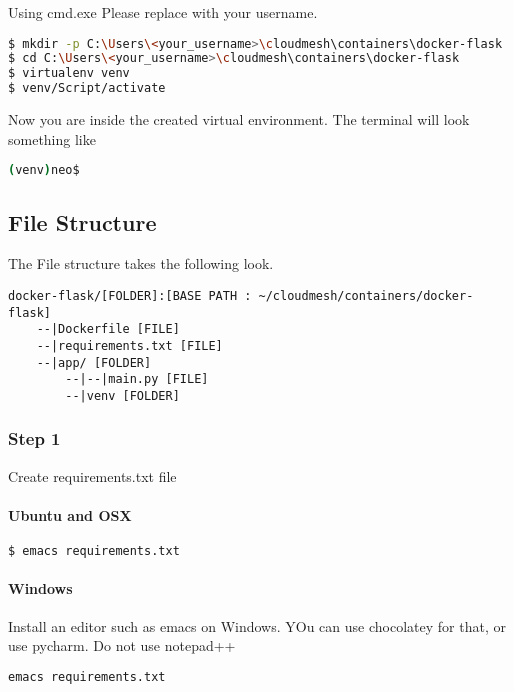 Using cmd.exe Please replace with your username.

\begin{lstlisting}[language=bash]
$ mkdir -p C:\Users\<your_username>\cloudmesh\containers\docker-flask
$ cd C:\Users\<your_username>\cloudmesh\containers\docker-flask
$ virtualenv venv
$ venv/Script/activate
\end{lstlisting}

Now you are inside the created virtual environment. The terminal will
look something like

\begin{lstlisting}[language=bash]
(venv)neo$
\end{lstlisting}

\subsection{File Structure}

The File structure takes the following look.

\begin{lstlisting}
docker-flask/[FOLDER]:[BASE PATH : ~/cloudmesh/containers/docker-flask]
    --|Dockerfile [FILE]
    --|requirements.txt [FILE]
    --|app/ [FOLDER]
        --|--|main.py [FILE]
        --|venv [FOLDER]
\end{lstlisting}

\subsubsection{Step 1}

Create requirements.txt file

\paragraph{Ubuntu and OSX}

\begin{lstlisting}[language=bash]
$ emacs requirements.txt
\end{lstlisting}

\paragraph{Windows}

Install an editor such as emacs on Windows. YOu can use chocolatey for
that, or use pycharm. Do not use notepad++

\begin{lstlisting}[language=bash]
emacs requirements.txt
\end{lstlisting}

